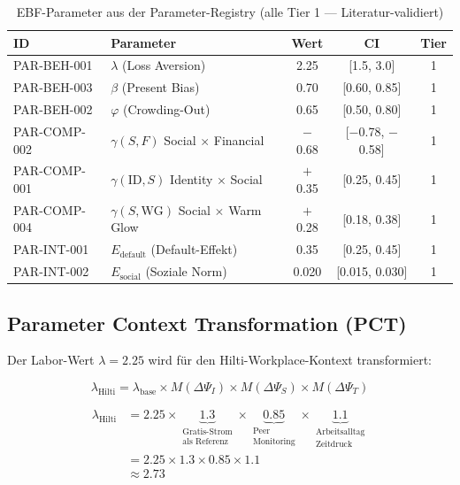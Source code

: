 \documentclass[11pt,a4paper]{article}
\begin{document}
\begin{table}[H]
\centering
{}
\begin{tabular}{llccc}
\toprule
\textbf{\color{fadarkblue}ID} & \textbf{\color{fadarkblue}Parameter} & \textbf{\color{fadarkblue}Wert} & \textbf{\color{fadarkblue}CI} & \textbf{\color{fadarkblue}Tier} \\
\midrule
PAR-BEH-001 & $\lambda$ (Loss Aversion) & 2.25 & [1.5, 3.0] & 1 \\
PAR-BEH-003 & $\beta$ (Present Bias) & 0.70 & [0.60, 0.85] & 1 \\
PAR-BEH-002 & $\varphi$ (Crowding-Out) & 0.65 & [0.50, 0.80] & 1 \\
\midrule
PAR-COMP-002 & $\gamma(S,F)$ Social $\times$ Financial & $-$0.68 & [$-$0.78, $-$0.58] & 1 \\
PAR-COMP-001 & $\gamma(\text{ID},S)$ Identity $\times$ Social & $+$0.35 & [0.25, 0.45] & 1 \\
PAR-COMP-004 & $\gamma(S,\text{WG})$ Social $\times$ Warm Glow & $+$0.28 & [0.18, 0.38] & 1 \\
\midrule
PAR-INT-001 & $E_{\text{default}}$ (Default-Effekt) & 0.35 & [0.25, 0.45] & 1 \\
PAR-INT-002 & $E_{\text{social}}$ (Soziale Norm) & 0.020 & [0.015, 0.030] & 1 \\
\bottomrule
\end{tabular}
\caption{EBF-Parameter aus der Parameter-Registry (alle Tier 1 --- Literatur-validiert)}
\end{table}

\subsection{Parameter Context Transformation (PCT)}

Der Labor-Wert $\lambda = 2.25$ wird f\"ur den Hilti-Workplace-Kontext transformiert:

\begin{equation}
\lambda_{\text{Hilti}} = \lambda_{\text{base}} \times M(\Delta\Psi_I) \times M(\Delta\Psi_S) \times M(\Delta\Psi_T)
\end{equation}

\begin{align}
\lambda_{\text{Hilti}} &= 2.25 \times \underbrace{1.3}_{\substack{\text{Gratis-Strom}\\\text{als Referenz}}} \times \underbrace{0.85}_{\substack{\text{Peer}\\\text{Monitoring}}} \times \underbrace{1.1}_{\substack{\text{Arbeitsalltag}\\\text{Zeitdruck}}} \\[6pt]
&= 2.25 \times 1.3 \times 0.85 \times 1.1 \\[6pt]
&\approx \mathbf{2.73}
\end{align}
\end{document}
